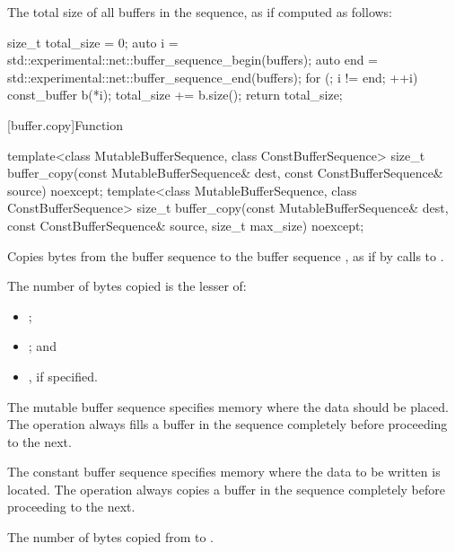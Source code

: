 \begin{itemdescr}
\pnum
\returns The total size of all buffers in the sequence, as if computed as follows:
\begin{codeblock}
size_t total_size = 0;
auto i = std::experimental::net::buffer_sequence_begin(buffers);
auto end = std::experimental::net::buffer_sequence_end(buffers);
for (; i != end; ++i)
{
  const_buffer b(*i);
  total_size += b.size();
}
return total_size;
\end{codeblock}

\end{itemdescr}



[buffer.copy]{Function }

%
\begin{itemdecl}
template<class MutableBufferSequence, class ConstBufferSequence>
  size_t buffer_copy(const MutableBufferSequence& dest,
                     const ConstBufferSequence& source) noexcept;
template<class MutableBufferSequence, class ConstBufferSequence>
  size_t buffer_copy(const MutableBufferSequence& dest,
                     const ConstBufferSequence& source,
                     size_t max_size) noexcept;
\end{itemdecl}

\begin{itemdescr}
\pnum
\effects Copies bytes from the buffer sequence  to the buffer sequence , as if by calls to .

\pnum
The number of bytes copied is the lesser of:
\begin{itemize}
\item
{};
\item
{}; and
\item
{}, if specified.
\end{itemize}

\pnum
The mutable buffer sequence  specifies memory where the data should be placed. The operation always fills a buffer in the sequence completely before proceeding to the next.

\pnum
The constant buffer sequence  specifies memory where the data to be written is located. The operation always copies a buffer in the sequence completely before proceeding to the next.

\pnum
\returns The number of bytes copied from  to .
\end{itemdescr}



